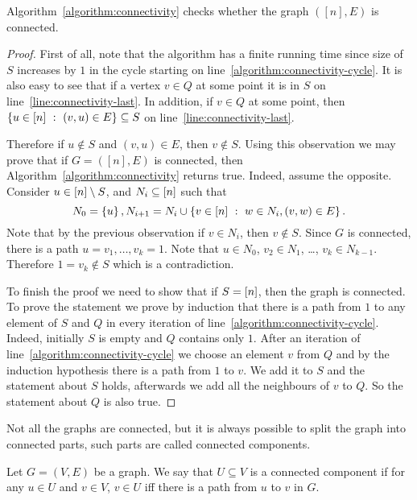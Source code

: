 \begin{theorem}
  Algorithm~\ref{algorithm:connectivity} checks whether the graph $([n], E)$
  is connected.
\end{theorem}
\begin{proof}
  First of all, note that the algorithm has a finite running time since
  size of $S$ increases by $1$ in the cycle starting on
  line~\ref{algorithm:connectivity-cycle}.
  It is also easy to see that if a vertex $v \in Q$ at some point it is
  in $S$ on line~\ref{line:connectivity-last}. In addition, if $v \in Q$
  at some point, then $\set[{(v, u) \in E}]{u \in \range{n}} \subseteq S$ on
  line~\ref{line:connectivity-last}.

  Therefore if $u \notin S$ and $(v, u) \in E$,
  then $v \notin S$. Using this observation we may prove that
  if $G = ([n], E)$ is connected, then Algorithm~\ref{algorithm:connectivity}
  returns true. Indeed, assume the opposite. Consider $u \in {[{n}]} \setminus S$,
  and $N_i \subseteq {[{n}]}$ such that \[
    N_0 = \set{u},
    N_{i + 1} = N_i \cup \set[{w \in N_i, (v, w) \in E}]{v \in \range{n}}.
  \]
  Note that by the previous observation if $v \in N_i$, then $v \notin S$.
  Since $G$ is connected, there is a path $u = v_1, \dots, v_k = 1$.
  Note that $u \in N_0$, $v_2 \in N_1$, \dots, $v_k \in N_{k - 1}$.
  Therefore $1 = v_k \notin S$ which is a contradiction.

  To finish the proof we need to show that if $S = {[{n}]}$, then the graph is
  connected. To prove the statement we prove by induction that there is a path
  from $1$ to any element of $S$ and $Q$ in every iteration of
  line~\ref{algorithm:connectivity-cycle}. Indeed, initially $S$ is empty and
  $Q$ contains only $1$. After an iteration of
  line~\ref{algorithm:connectivity-cycle} we choose an element $v$ from $Q$
  and by the induction hypothesis there is a path from $1$ to $v$.
  We add it to $S$ and the statement about $S$ holds, afterwards we
  add all the neighbours of $v$ to $Q$. So the statement about $Q$ is
  also true.
\end{proof}

Not all the graphs are connected, but it is always possible to split the
graph into connected parts, such parts are called connected components.
\begin{definition}
  Let $G = (V, E)$ be a graph. We say that $U \subseteq V$ is a connected
  component if for any $u \in U$ and $v \in V$,
  $v \in U$ iff there is a path from $u$ to $v$ in $G$.
\end{definition}

